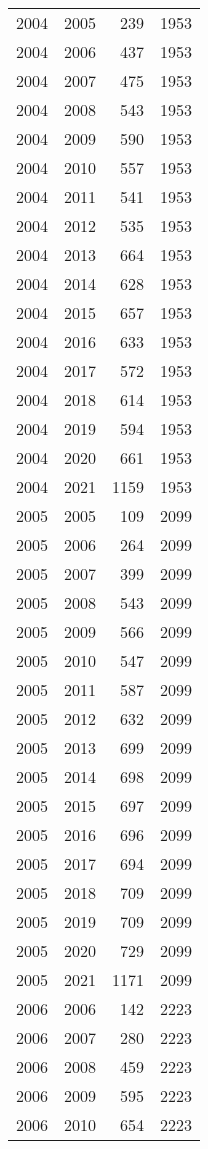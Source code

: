 \documentclass[
  10pt,
  letterpaper,
  DIV=11,
  numbers=noendperiod,
  twoside]{scrartcl}
\begin{document}
\begin{longtable}[]{@{}rrrr@{}}
2004 & 2005 & 239 & 1953 \\
2004 & 2006 & 437 & 1953 \\
2004 & 2007 & 475 & 1953 \\
2004 & 2008 & 543 & 1953 \\
2004 & 2009 & 590 & 1953 \\
2004 & 2010 & 557 & 1953 \\
2004 & 2011 & 541 & 1953 \\
2004 & 2012 & 535 & 1953 \\
2004 & 2013 & 664 & 1953 \\
2004 & 2014 & 628 & 1953 \\
2004 & 2015 & 657 & 1953 \\
2004 & 2016 & 633 & 1953 \\
2004 & 2017 & 572 & 1953 \\
2004 & 2018 & 614 & 1953 \\
2004 & 2019 & 594 & 1953 \\
2004 & 2020 & 661 & 1953 \\
2004 & 2021 & 1159 & 1953 \\
2005 & 2005 & 109 & 2099 \\
2005 & 2006 & 264 & 2099 \\
2005 & 2007 & 399 & 2099 \\
2005 & 2008 & 543 & 2099 \\
2005 & 2009 & 566 & 2099 \\
2005 & 2010 & 547 & 2099 \\
2005 & 2011 & 587 & 2099 \\
2005 & 2012 & 632 & 2099 \\
2005 & 2013 & 699 & 2099 \\
2005 & 2014 & 698 & 2099 \\
2005 & 2015 & 697 & 2099 \\
2005 & 2016 & 696 & 2099 \\
2005 & 2017 & 694 & 2099 \\
2005 & 2018 & 709 & 2099 \\
2005 & 2019 & 709 & 2099 \\
2005 & 2020 & 729 & 2099 \\
2005 & 2021 & 1171 & 2099 \\
2006 & 2006 & 142 & 2223 \\
2006 & 2007 & 280 & 2223 \\
2006 & 2008 & 459 & 2223 \\
2006 & 2009 & 595 & 2223 \\
2006 & 2010 & 654 & 2223 \\

\end{longtable}
\end{document}
